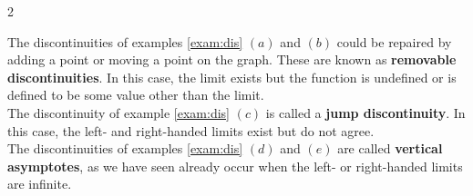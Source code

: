 \documentclass{book}
\begin{document}
\begin{Exam}
\begin{enumerate}
\begin{multicols}{2}
\begin{center}
\end{center} 
\end{multicols}
\end{enumerate}\vspace{-15 pt}
\end{Exam}\vs

\begin{Def}  The discontinuities of examples \ref{exam:dis} $(a)$ and $(b)$ could be repaired by adding a point or moving a point on the graph. These are known as \textbf{removable discontinuities}. In this case, the limit exists but the function is undefined or is defined to be some value other than the limit.\\

The discontinuity of example \ref{exam:dis} $(c)$ is called a \textbf{jump discontinuity}. In this case, the left- and right-handed limits exist but do not agree.\\

The discontinuities of examples \ref{exam:dis} $(d)$ and $(e)$ are called \textbf{vertical asymptotes}, as we have seen already occur when the left- or right-handed limits are infinite.
\end{Def}\vs
\end{document}
